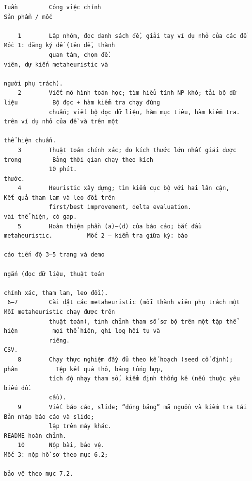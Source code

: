 \documentclass[a4paper,11pt]{article}
\begin{document}
\begin{Verbatim}[fontsize=\tiny,breaklines=true,breakanywhere=true]
Tuần         Công việc chính                                                      Sản phẩm / mốc

    1        Lập nhóm, đọc danh sách đề, giải tay ví dụ nhỏ của các đề            Mốc 1: đăng ký đề (tên đề, thành
             quan tâm, chọn đề.                                                   viên, dự kiến metaheuristic và
                                                                                  người phụ trách).
    2        Viết mô hình toán học; tìm hiểu tính NP-khó; tải bộ dữ liệu          Bộ đọc + hàm kiểm tra chạy đúng
             chuẩn; viết bộ đọc dữ liệu, hàm mục tiêu, hàm kiểm tra.              trên ví dụ nhỏ của đề và trên một
                                                                                  thể hiện chuẩn.
    3        Thuật toán chính xác; đo kích thước lớn nhất giải được trong         Bảng thời gian chạy theo kích
             10 phút.                                                             thước.
    4        Heuristic xây dựng; tìm kiếm cục bộ với hai lân cận,                 Kết quả tham lam và leo đồi trên
             first/best improvement, delta evaluation.                            vài thể hiện, có gap.
    5        Hoàn thiện phần (a)–(d) của báo cáo; bắt đầu metaheuristic.          Mốc 2 – kiểm tra giữa kỳ: báo
                                                                                  cáo tiến độ 3–5 trang và demo
                                                                                  ngắn (đọc dữ liệu, thuật toán
                                                                                  chính xác, tham lam, leo đồi).
 6–7         Cài đặt các metaheuristic (mỗi thành viên phụ trách một              Mỗi metaheuristic chạy được trên
             thuật toán), tinh chỉnh tham số sơ bộ trên một tập thể hiện          mọi thể hiện, ghi log hội tụ và
             riêng.                                                               CSV.
    8        Chạy thực nghiệm đầy đủ theo kế hoạch (seed cố định); phân           Tệp kết quả thô, bảng tổng hợp,
             tích độ nhạy tham số, kiểm định thống kê (nếu thuộc yêu              biểu đồ.
             cầu).
    9        Viết báo cáo, slide; “đóng băng” mã nguồn và kiểm tra tái            Bản nháp báo cáo và slide;
             lập trên máy khác.                                                   README hoàn chỉnh.
    10       Nộp bài, bảo vệ.                                                     Mốc 3: nộp hồ sơ theo mục 6.2;
                                                                                  bảo vệ theo mục 7.2.

\end{Verbatim}
\end{document}
